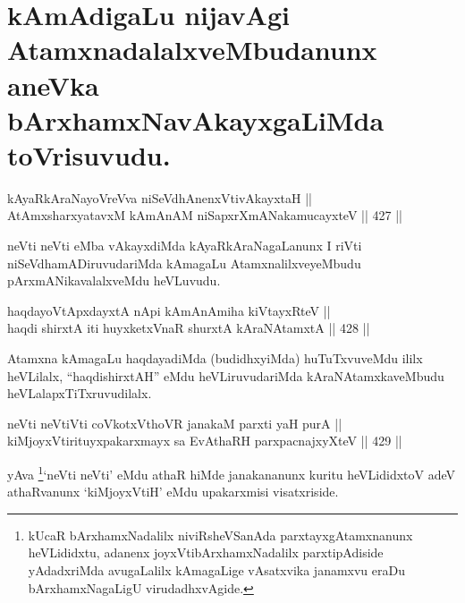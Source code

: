 \section*{kAmAdigaLu nijavAgi AtamxnadalalxveMbudanunx aneVka bArxhamxNavAkayxgaLiMda toVrisuvudu.}


\begin{shl}
kAyaRkAraNayoVreVva niSeVdhAnenxVtivAkayxtaH || \\
AtAmxsharxyatavxM kAmAnAM niSapxrXmANakamucayxteV \hfill || 427 ||  
\end{shl}

\begin{artha}
neVti neVti eMba vAkayxdiMda kAyaRkAraNagaLanunx I riVti
niSeVdhamADiruvudariMda kAmagaLu AtamxnalilxveyeMbudu
pArxmANikavalalxveMdu heVLuvudu.
\end{artha}


\begin{shl}
haqdayoVtApxdayxtA nApi kAmAnAmiha kiVtayxRteV || \\
haqdi shirxtA iti huyxketxVnaR shurxtA kAraNAtamxtA \hfill || 428 ||  
\end{shl}

\begin{artha}
Atamxna kAmagaLu haqdayadiMda (budidhxyiMda) huTuTxvuveMdu ililx
heVLilalx, ``haqdishirxtAH'' eMdu heVLiruvudariMda kAraNAtamxkaveMbudu
heVLalapxTiTxruvudilalx.
\end{artha}

\begin{shl}
neVti neVtiVti coVkotxV\s thoVR janakaM parxti yaH purA || \\
kiMjoyxVtirituyxpakarxmayx sa EvAthaRH parxpacnajxyXteV \hfill || 429 ||  
\end{shl}

\begin{artha}
yAva \footnote{kUcaR bArxhamxNadalilx niviRsheVSanAda
parxtayxgAtamxnanunx heVLididxtu, adanenx joyxVtibArxhamxNadalilx
parxtipAdiside yAdadxriMda avugaLalilx kAmagaLige vAsatxvika
janamxvu eraDu bArxhamxNagaLigU virudadhxvAgide.}`neVti neVti' eMdu athaR hiMde janakananunx kuritu heVLididxtoV
adeV athaRvanunx `kiMjoyxVtiH' eMdu upakarxmisi visatxriside. 
\end{artha}

